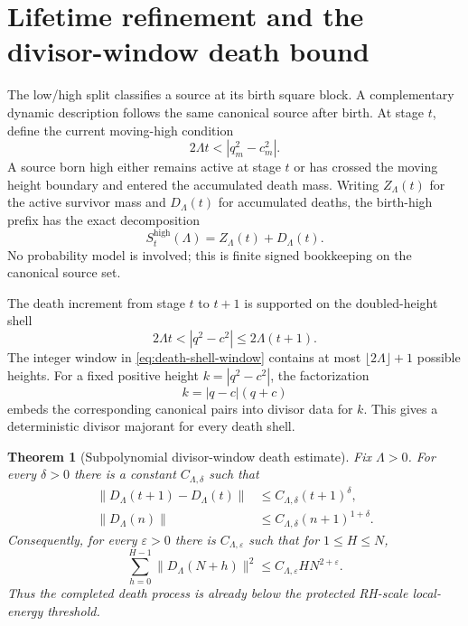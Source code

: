 \documentclass[11pt]{article}
\newtheorem{theorem}{Theorem}[section]
\theoremstyle{definition}
\newcommand{\eps}{\varepsilon}
\newcommand{\1}{\mathbf{1}}
\begin{document}
\section{Lifetime refinement and the divisor-window death bound}
\label{sec:lifetime-death}

The low/high split classifies a source at its birth square block.  A complementary dynamic description follows the same canonical source after birth.  At stage $t$, define the current moving-high condition
\begin{equation}
 2\Lambda t<|q_m^2-c_m^2|.
 \label{eq:moving-high-condition}
\end{equation}
A source born high either remains active at stage $t$ or has crossed the moving height boundary and entered the accumulated death mass.  Writing $Z_\Lambda(t)$ for the active survivor mass and $D_\Lambda(t)$ for accumulated deaths, the birth-high prefix has the exact decomposition
\begin{equation}
 \boxed{S_t^{\mathrm{high}}(\Lambda)=Z_\Lambda(t)+D_\Lambda(t).}
 \label{eq:high-active-death}
\end{equation}
No probability model is involved; this is finite signed bookkeeping on the canonical source set.

The death increment from stage $t$ to $t+1$ is supported on the doubled-height shell
\begin{equation}
 2\Lambda t<|q^2-c^2|\le2\Lambda(t+1).
 \label{eq:death-shell-window}
\end{equation}
The integer window in \cref{eq:death-shell-window} contains at most $\lfloor2\Lambda\rfloor+1$ possible heights.  For a fixed positive height $k=|q^2-c^2|$, the factorization
\begin{equation}
 k=|q-c|(q+c)
 \label{eq:height-factorization}
\end{equation}
embeds the corresponding canonical pairs into divisor data for $k$.  This gives a deterministic divisor majorant for every death shell.

\begin{theorem}[Subpolynomial divisor-window death estimate]
\label{thm:death-subpolynomial}
Fix $\Lambda>0$.  For every $\delta>0$ there is a constant $C_{\Lambda,\delta}$ such that
\begin{align}
 \|D_\Lambda(t+1)-D_\Lambda(t)\|
 &\le C_{\Lambda,\delta}(t+1)^\delta,
 \label{eq:death-increment-subpoly}\\
 \|D_\Lambda(n)\|
 &\le C_{\Lambda,\delta}(n+1)^{1+\delta}.
 \label{eq:death-mass-subpoly}
\end{align}
Consequently, for every $\eps>0$ there is $C_{\Lambda,\eps}$ such that for $1\le H\le N$,
\begin{equation}
 \boxed{
 \sum_{h=0}^{H-1}\|D_\Lambda(N+h)\|^2
 \le C_{\Lambda,\eps}H N^{2+\eps}.
 }
 \label{eq:death-local-energy}
\end{equation}
Thus the completed death process is already below the protected RH-scale local-energy threshold.
\end{theorem}
\end{document}

